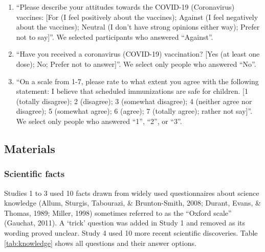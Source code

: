 \documentclass[
  doc,floatsintext]{apa6}
\providecommand{\tightlist}{%
  \setlength{\itemsep}{0pt}\setlength{\parskip}{0pt}}
\begin{document}
\begin{enumerate}
\def\labelenumi{\arabic{enumi}.}
\tightlist
\item
  ``Please describe your attitudes towards the COVID-19 (Coronavirus) vaccines: {[}For (I feel positively about the vaccines); Against (I feel negatively about the vaccines); Neutral (I don't have strong opinions either way); Prefer not to say{]}''. We selected participants who answered ``Against''.
\item
  ``Have you received a coronavirus (COVID-19) vaccination? {[}Yes (at least one dose); No; Prefer not to answer{]}''. We select only people who answered ``No''.
\item
  ``On a scale from 1-7, please rate to what extent you agree with the following statement: I believe that scheduled immunizations are safe for children. {[}1 (totally disagree); 2 (disagree); 3 (somewhat disagree); 4 (neither agree nor disagree); 5 (somewhat agree); 6 (agree); 7 (totally agree); rather not say{]}''. We select only people who answered ``1'', ``2'', or ``3''.
\end{enumerate}

\subsection{Materials}\label{materials-1}

\subsubsection{Scientific facts}\label{scientific-facts}

Studies 1 to 3 used 10 facts drawn from widely used questionnaires about science knowledge (Allum, Sturgis, Tabourazi, \& Brunton-Smith, 2008; Durant, Evans, \& Thomas, 1989; Miller, 1998) sometimes referred to as the ``Oxford scale'' (Gauchat, 2011). A `trick' question was added in Study 1 and removed as its wording proved unclear. Study 4 used 10 more recent scientific discoveries. Table \ref{tab:knowledge} shows all questions and their answer options.
\end{document}
